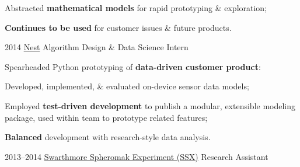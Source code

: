 \documentclass[]{friggeri-cv}
\begin{document}
\begin{entrylist}
{\begin{my-itemize}
        \begin{my-itemize}
        \item Abstracted \textbf{mathematical models} for rapid prototyping \& exploration;
        \item \textbf{Continues to be used} for customer issues \& future products.
        \end{my-itemize}
      \end{my-itemize}
    }
  \entry
    {2014}
    {\href{http://nest.com}{Nest}}
    {Algorithm Design \& Data Science Intern}
    {
      \bodyspace
      \begin{my-itemize}
      \item Spearheaded Python prototyping of \textbf{data-driven customer product}:

      \begin{my-itemize}
      \item Developed, implemented, \& evaluated on-device sensor data models;
      \item Employed \textbf{test-driven development} to publish a modular, extensible modeling package, used within team to prototype related features;
      \item \textbf{Balanced} development with research-style data analysis.
      \end{my-itemize}

      \end{my-itemize}
    }
  \entry
    {2013--2014} %
    {\href{http://www.swarthmore.edu/ssx-lab}{Swarthmore Spheromak Experiment (SSX)}}
    {Research Assistant}
    {
      \bodyspace
      \begin{my-itemize}


\end{my-itemize}}
\end{entrylist}
\end{document}

